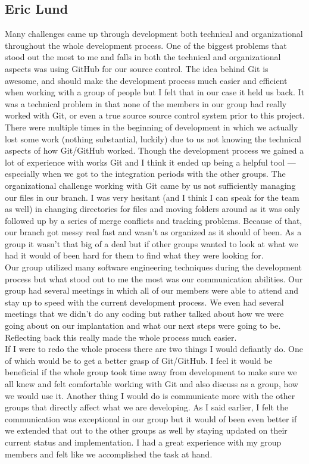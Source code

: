 \documentclass[12pt]{article}
\begin{document}
\subsection{Eric Lund}
\begin{changemargin}{1cm}{0cm} 
          Many challenges came up through development both technical and organizational throughout the whole development process. One of the biggest problems that stood out the most to me and falls in both the technical and organizational aspects was using GitHub for our source control.  The idea behind Git is awesome, and should make the development process much easier and efficient when working with a group of people but I felt that in our case it held us back. It was a technical problem in that none of the members in our group had really worked with Git, or even a true source source control system prior to this project. There were multiple times in the beginning of development in which we actually lost some work (nothing substantial, luckily) due to us not knowing the technical aspects of how Git/GitHub worked. Though the development process we gained a lot of experience with works Git and I think it ended up being a helpful tool — especially when we got to the integration periods with the other groups. The organizational challenge working with Git came by us not sufficiently managing our files in our branch. I was very hesitant (and I think I can speak for the team as well) in changing directories for files and moving folders around as it was only followed up by a series of merge conflicts and tracking problems. Because of that, our branch got messy real fast and wasn't as organized as it should of been. As a group it wasn't that big of a deal but if other groups wanted to look at what we had it would of been hard for them to find what they were looking for. \\
          
           Our group utilized many software engineering techniques during the development process but what stood out to me the most was our communication abilities. Our group had several meetings in which all of our members were able to attend and stay up to speed with the current development process. We even had several meetings that we didn't do any coding but rather talked about how we were going about on our implantation and what our next steps were going to be. Reflecting back this really made the whole process much easier.\\
           
           If I were to redo the whole process there are two things I would defiantly do. One of which would be to get a better grasp of Git/GitHub. I feel it would be beneficial if the whole group took time away from development to make sure we all knew and felt comfortable working with Git and also discuss as a group, how we would use it. Another thing I would do is communicate more with the other groups that directly affect what we are developing. As I said earlier, I felt the communication was exceptional in our group but it would of been even better if we extended that out to the other groups as well by staying updated on their current status and implementation. I had a great experience with my group members and felt like we accomplished the task at hand. 
\end{changemargin} 
\end{document}
